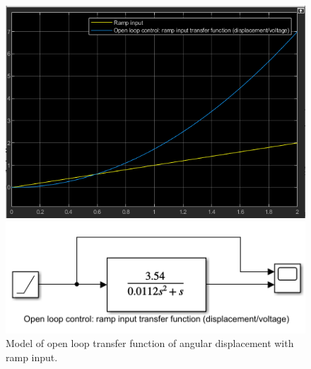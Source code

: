 \documentclass[conference]{IEEEtran}
\begin{document}
\begin{figure}[htbp]
    \centering
    \begin{minipage}[b]{0.24\textwidth}
        \includegraphics[width=\textwidth]{./Graph/G6.png}
        \caption{}
        \label{oltad3}
    \end{minipage}
    \hfill
    \begin{minipage}[b]{0.24\textwidth}
        \centering
        \includegraphics[width=\textwidth]{./Graph/G6'.png}
        \caption{Model of open loop transfer function of angular displacement with ramp input.}
    \end{minipage}
\end{figure}
\end{document}
